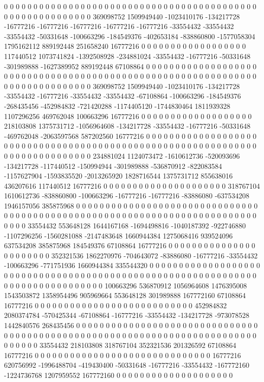 0 0 0 0 0 0 0 0 0 0 0 0 0 0 0 0 0 0 0 0 0 0 0 0 0 0 0 0 0 0 0 0 0 0 0 0 0 0 0 0 0 0 0 0 0 0 0 0 0 0 0 0 0 0 0 0 0 0 369098752 1509949440 -1023410176 -134217728 -16777216 -16777216 -16777216 -16777216 -16777216 -33554432 -33554432 -33554432 -50331648 -100663296 -184549376 -402653184 -838860800 -1577058304 1795162112 889192448 251658240 16777216 0 0 0 0 0 0 0 0 0 0 0 0 0 0 0 0 0 0 117440512 1073741824 -1392508928 -234881024 -33554432 -16777216 -50331648 -301989888 -1627389952 889192448 67108864 0 0 0 0 0 0 0 0 0 0 0 0 0 0 0 0 0 0 0
0 0 0 0 0 0 0 0 0 0 0 0 0 0 0 0 0 0 0 0 0 0 0 0 0 0 0 0 0 0 0 0 0 0 0 0 0 0 0 0 0 0 0 0 0 0 0 0 0 0 0 0 0 0 0 0 0 0 369098752 1509949440 -1023410176 -134217728 -33554432 -16777216 -33554432 -33554432 -67108864 -100663296 -184549376 -268435456 -452984832 -721420288 -1174405120 -1744830464 1811939328 1107296256 469762048 100663296 16777216 0 0 0 0 0 0 0 0 0 0 0 0 0 0 0 0 0 0 0 218103808 1375731712 -1056964608 -134217728 -33554432 -16777216 -50331648 -469762048 -2063597568 587202560 16777216 0 0 0 0 0 0 0 0 0 0 0 0 0 0 0 0 0 0 0
0 0 0 0 0 0 0 0 0 0 0 0 0 0 0 0 0 0 0 0 0 0 0 0 0 0 0 0 0 0 0 0 0 0 0 0 0 0 0 0 0 0 0 0 0 0 0 0 0 0 0 0 0 0 0 0 0 0 234881024 1124073472 -1610612736 -520093696 -134217728 -117440512 -150994944 -301989888 -536870912 -822083584 -1157627904 -1593835520 -2013265920 1828716544 1375731712 855638016 436207616 117440512 16777216 0 0 0 0 0 0 0 0 0 0 0 0 0 0 0 0 0 0 0 0 0 318767104 1610612736 -838860800 -100663296 -16777216 -16777216 -83886080 -637534208 1946157056 385875968 0 0 0 0 0 0 0 0 0 0 0 0 0 0 0 0 0 0 0 0
0 0 0 0 0 0 0 0 0 0 0 0 0 0 0 0 0 0 0 0 0 0 0 0 0 0 0 0 0 0 0 0 0 0 0 0 0 0 0 0 0 0 0 0 0 0 0 0 0 0 0 0 0 0 0 0 0 0 33554432 553648128 1644167168 -1694498816 -1040187392 -922746880 -1107296256 -1560281088 -2147483648 1660944384 1275068416 939524096 637534208 385875968 184549376 67108864 16777216 0 0 0 0 0 0 0 0 0 0 0 0 0 0 0 0 0 0 0 0 0 0 0 352321536 1862270976 -704643072 -83886080 -16777216 -33554432 -100663296 -771751936 1660944384 335544320 0 0 0 0 0 0 0 0 0 0 0 0 0 0 0 0 0 0 0 0
0 0 0 0 0 0 0 0 0 0 0 0 0 0 0 0 0 0 0 0 0 0 0 0 0 0 0 0 0 0 0 0 0 0 0 0 0 0 0 0 0 0 0 0 0 0 0 0 0 0 0 0 0 0 0 0 0 0 0 100663296 536870912 1056964608 1476395008 1543503872 1358954496 905969664 553648128 301989888 167772160 67108864 16777216 0 0 0 0 0 0 0 0 0 0 0 0 0 0 0 0 0 0 0 0 0 0 0 0 0 0 0 452984832 2080374784 -570425344 -67108864 -16777216 -33554432 -134217728 -973078528 1442840576 268435456 0 0 0 0 0 0 0 0 0 0 0 0 0 0 0 0 0 0 0 0
0 0 0 0 0 0 0 0 0 0 0 0 0 0 0 0 0 0 0 0 0 0 0 0 0 0 0 0 0 0 0 0 0 0 0 0 0 0 0 0 0 0 0 0 0 0 0 0 0 0 0 0 0 0 0 0 0 0 0 0 33554432 218103808 318767104 352321536 201326592 67108864 16777216 0 0 0 0 0 0 0 0 0 0 0 0 0 0 0 0 0 0 0 0 0 0 0 0 0 0 0 0 0 0 16777216 620756992 -1996488704 -419430400 -50331648 -16777216 -33554432 -167772160 -1224736768 1207959552 167772160 0 0 0 0 0 0 0 0 0 0 0 0 0 0 0 0 0 0 0 0
